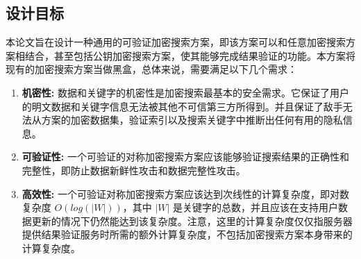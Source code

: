 \subsection{设计目标}

本论文旨在设计一种通用的可验证加密搜索方案，即该方案可以和任意加密搜索方案相结合，甚至包括公钥加密搜索方案，使其能够完成结果验证的功能。本方案将现有的加密搜索方案当做黑盒，总体来说，需要满足以下几个需求：

\begin{enumerate}
	\item \textbf{机密性:} 数据和关键字的机密性是加密搜索最基本的安全需求。它保证了用户的明文数据和关键字信息无法被其他不可信第三方所得到。并且保证了敌手无法从方案的加密数据集，验证索引以及搜索关键字中推断出任何有用的隐私信息。
	\item \textbf{可验证性:} 一个可验证的对称加密搜索方案应该能够验证搜索结果的正确性和完整性，即防止数据新鲜性攻击和数据完整性攻击。%
	\item \textbf{高效性:} 一个可验证对称加密搜索方案应该达到次线性的计算复杂度，即对数复杂度 $O(log(|W|))$，其中 $|W|$ 是关键字的总数，并且应该在支持用户数据更新的情况下仍然能达到该复杂度。注意，这里的计算复杂度仅仅指服务器提供结果验证服务时所需的额外计算复杂度，不包括加密搜索方案本身带来的计算复杂度。%
\end{enumerate}

